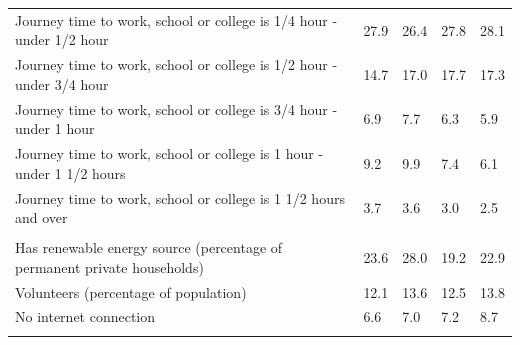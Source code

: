 \documentclass{article}
\begin{document}
\begin{table}[h]
\begin{tabular}{KTTTT}
Journey time to work, school or college is 1/4 hour - under 1/2 hour & 27.9& 26.4& 27.8& 28.1\\
Journey time to work, school or college is 1/2 hour - under 3/4 hour & 14.7& 17.0& 17.7& 17.3\\
Journey time to work, school or college is 3/4 hour - under 1 hour & 6.9& 7.7& 6.3& 5.9\\
Journey time to work, school or college is 1 hour - under 1 1/2 hours & 9.2& 9.9& 7.4& 6.1\\
Journey time to work, school or college is 1 1/2 hours and over & 3.7& 3.6& 3.0& 2.5\\
\hline
    \\ 
    \hline
Has renewable energy source (percentage of permanent private households) & 23.6& 28.0& 19.2& 22.9\\
    \hline
Volunteers (percentage of population) & 12.1& 13.6& 12.5& 13.8\\
    \hline
No internet connection& 6.6& 7.0& 7.2& 8.7\\
\hline
\end{tabular}
\end{table}
\end{document}
